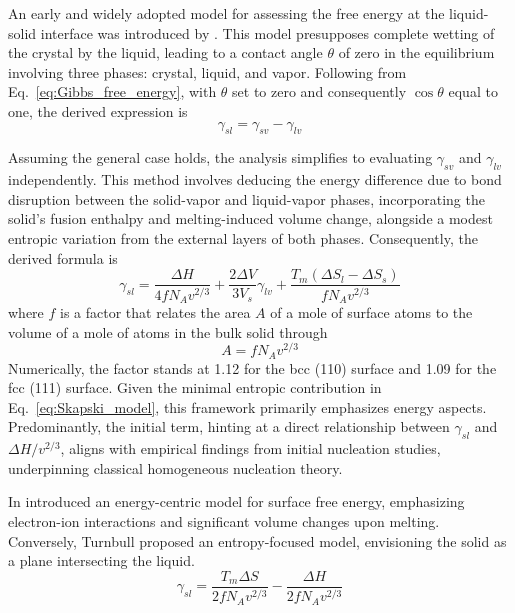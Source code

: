 An early and widely adopted model for assessing the free energy at the liquid-solid interface was introduced by \cite{Skapski1956ATO}. This model 
presupposes complete wetting of the crystal by the liquid, leading to a contact angle $\theta$ of zero in the equilibrium involving three phases: 
crystal, liquid, and vapor. Following from Eq.~\ref{eq:Gibbs_free_energy}, with $\theta$ set to zero and consequently $\cos \theta$ equal to one, the derived expression is
\begin{equation} \label{eq:Skapski_model}
\gamma_{sl} = \gamma_{sv} - \gamma_{lv}
\end{equation}

Assuming the general case holds, the analysis simplifies to evaluating $\gamma_{sv}$ and $\gamma_{lv}$ independently. This method involves deducing the 
energy difference due to bond disruption between the solid-vapor and liquid-vapor phases, incorporating the solid's fusion enthalpy and melting-induced volume 
change, alongside a modest entropic variation from the external layers of both phases. Consequently, the derived formula is
\begin{equation} \label{eq:Skapski_result}
\gamma_{sl} = \frac{\Delta H}{4f N_{A} v^{2/3}} + \frac{2\Delta V}{3V_{s}} \gamma_{lv} + \frac{T_m (\Delta S_l - \Delta S_s)}{f N_{A} v^{2/3}}
\end{equation}
where $f$ is a factor that relates the area $A$ of a mole of surface atoms to the volume of a mole of atoms in the bulk solid through
\begin{equation} \label{eq:relation_factor}
A = f N_{A} v^{2/3}
\end{equation}
Numerically, the factor stands at 1.12 for the bcc (110) surface and 1.09 for the fcc (111) surface. Given the 
minimal entropic contribution in Eq.~\ref{eq:Skapski_model}, this framework primarily emphasizes energy aspects. 
Predominantly, the initial term, hinting at a direct relationship between $\gamma_{sl}$ and $\Delta H/v^{2/3}$, 
aligns with empirical findings from initial nucleation studies, underpinning classical homogeneous nucleation theory.

In \cite{Zadumkin1966SurfaceEA} introduced an energy-centric model for surface free energy, emphasizing electron-ion interactions and 
significant volume changes upon melting. Conversely, Turnbull proposed an entropy-focused model, envisioning the solid as a plane 
intersecting the liquid. 
\begin{equation} \label{eq:Turnbull_model}
\gamma_{sl} = \frac{T_m \Delta S}{2f N_{A} v^{2/3}} - \frac{\Delta H}{2f N_{A} v^{2/3}}
\end{equation}

